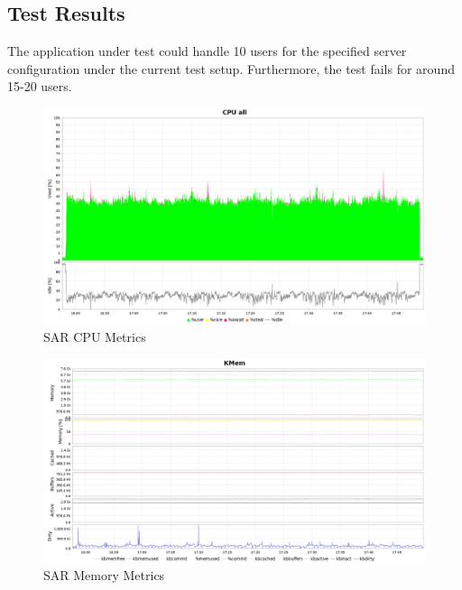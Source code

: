 \documentclass[12pt]{report}
\begin{document}
\subsection{Test Results}
The application under test could handle 10 users for the specified server configuration under the current test setup. Furthermore, the test fails for around 15-20 users.
\clearpage
\begin{figure}[h!]
	\centering
	\includegraphics[width=\textwidth,height=\textheight,keepaspectratio]{intro/cpu_harshit.png}
	\caption{SAR CPU Metrics}
\end{figure}
\begin{figure}[h!]
	\centering
	\includegraphics[width=\textwidth,height=\textheight,keepaspectratio]{intro/mem_harshit.png}
	\caption{SAR Memory Metrics}
\end{figure}
\end{document}
